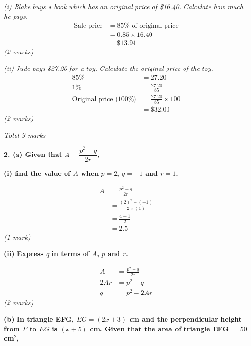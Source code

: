 \documentclass[12pt,a4paper]{article}
\newcommand{\qhead}[1]{\vspace{0.6em}\noindent\textbf{\large #1}\par\vspace{0.3em}}
\newcommand{\subhead}[1]{\vspace{0.3em}\noindent\textbf{#1}\par}
\newcommand{\qmarks}[1]{\hfill\textit{(#1)}}
\begin{document}
\textit{(i) Blake buys a book which has an original price of \$16.40. Calculate how much he pays.}
\begin{align*}
\text{Sale price} &= 85\% \text{ of original price} \\
&= 0.85 \times 16.40 \\
&= \$13.94
\end{align*}
\qmarks{2 marks}

\textit{(ii) Jude pays \$27.20 for a toy. Calculate the original price of the toy.}
\begin{align*}
85\% &= 27.20 \\
1\% &= \frac{27.20}{85} \\
\text{Original price (100\%)} &= \frac{27.20}{85}\times 100 \\
&= \$32.00
\end{align*}
\qmarks{2 marks}

\hfill\textit{Total 9 marks}

\newpage
\qhead{2. (a) Given that $A = \dfrac{p^2 - q}{2r}$,}

\subhead{(i) find the value of $A$ when $p = 2$, $q = -1$ and $r = 1$.}
\begin{align*}
A &= \frac{p^2 - q}{2r} \\
&= \frac{(2)^2 - (-1)}{2\times(1)} \\
&= \frac{4+1}{2} \\
&= 2.5
\end{align*}
\qmarks{1 mark}

\subhead{(ii) Express $q$ in terms of $A$, $p$ and $r$.}
\begin{align*}
A &= \frac{p^2 - q}{2r} \\
2Ar &= p^2 - q \\
q &= p^2 - 2Ar
\end{align*}
\qmarks{2 marks}

\subhead{(b) In triangle EFG, $EG = (2x+3)$ cm and the perpendicular height from $F$ to $EG$ is $(x+5)$ cm. Given that the area of triangle EFG $= 50$ cm$^2$,}

\begin{center}
\end{center}
\end{document}
